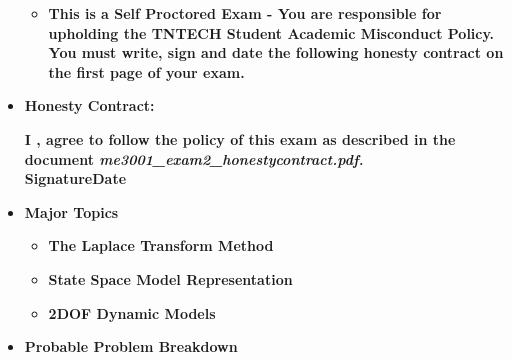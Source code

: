 \documentclass[11pt]{article}
\begin{document}
\begin{itemize}
\begin{itemize}
		\item \textbf{ This is a Self Proctored Exam - You are responsible for upholding the TNTECH Student Academic Misconduct Policy. You must write, sign and date the following honesty contract on the first page of your exam. }\\
\end{itemize}
\large 
		\item \textbf{Honesty Contract:}
\begin{framed}
		 \textbf{I \underline{\hspace{50mm}}, agree to follow the policy of this exam as described in the document {\it me3001\_exam2\_honestycontract.pdf. }}\vspace{3mm}\\
		 \textbf{Signature\underline{\hspace{80mm}}\hspace{10mm}Date\underline{\hspace{20mm}}}\\
\end{framed}
	
\newpage
\item  \textbf{\Large Major Topics}\\
	\begin{itemize}


		\item  \textbf{\large The Laplace Transform Method}\vspace{0mm}\\
		\item  \textbf{\large State Space Model Representation}\vspace{0mm}\\
		\item  \textbf{\large 2DOF Dynamic Models}\\


	\end{itemize}

\item  \textbf{\Large Probable Problem Breakdown}\\
\Large
	\begin{enumerate}



\end{enumerate}
\end{itemize}
\end{document}
